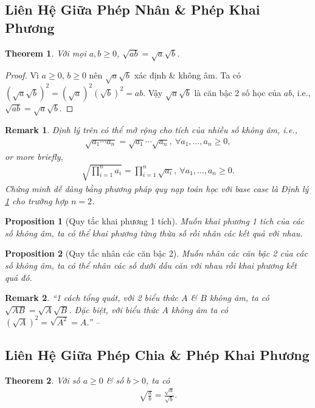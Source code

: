 \documentclass{article}
\numberwithin{equation}{section}
\newtheorem{proposition}{Proposition}[section]
\newtheorem{remark}{Remark}[section]
\newtheorem{theorem}{Theorem}[section]
\begin{document}
\subsection{Liên Hệ Giữa Phép Nhân \& Phép Khai Phương}
\begin{theorem}
	\label{theorem:sqrt & product}
	Với mọi $a,b\ge 0$, $\sqrt{ab} = \sqrt{a}\sqrt{b}$.
\end{theorem}

\begin{proof}
	Vì $a\ge 0$, $b\ge 0$ nên $\sqrt{a}\sqrt{b}$ xác định \& không âm. Ta có $(\sqrt{a}\sqrt{b})^2 = (\sqrt{a})^2(\sqrt{b})^2 = ab$. Vậy $\sqrt{a}\sqrt{b}$ là căn bậc 2 số học của $ab$, i.e., $\sqrt{ab} = \sqrt{a}\sqrt{b}$.
\end{proof}

\begin{remark}
	Định lý trên có thể mở rộng cho tích của nhiều số không âm, i.e.,
	\begin{align*}
		\sqrt{a_1\cdots a_n} = \sqrt{a_1}\cdots\sqrt{a_n},\ \forall a_1,\ldots,a_n\ge 0,
	\end{align*}
	or more briefly,
	\begin{align*}
		\sqrt{\prod_{i=1}^n a_i} = \prod_{i=1}^n \sqrt{a_i},\ \forall a_1,\ldots,a_n\ge 0.
	\end{align*}
	Chứng minh dễ dàng bằng phương pháp quy nạp toán học với base case là Định lý \ref{theorem:sqrt & product} cho trường hợp $n = 2$.
\end{remark}

\begin{proposition}[Quy tắc khai phương 1 tích]
	Muốn khai phương 1 tích của các số không âm, ta có thể khai phương từng thừa số rồi nhân các kết quả với nhau.
\end{proposition}

\begin{proposition}[Quy tắc nhân các căn bậc 2]
	Muốn nhân các căn bậc 2 của các số không âm, ta có thể nhân các số dưới dấu căn với nhau rồi khai phương kết quả đó.
\end{proposition}

\begin{remark}
	``1 cách tổng quát, với 2 biểu thức $A$ \& $B$ không âm, ta có $\sqrt{AB} = \sqrt{A}\sqrt{B}$. Đặc biệt, với biểu thức $A$ không âm ta có $(\sqrt{A})^2 = \sqrt{A^2} = A$.'' -- \cite[p. 14]{SGK_Toan_9_tap_1}
\end{remark}

\subsection{Liên Hệ Giữa Phép Chia \& Phép Khai Phương}
\begin{theorem}
	Với số $a\ge 0$ \& số $b > 0$, ta có
	\begin{align*}
		\sqrt{\frac{a}{b}} = \frac{\sqrt{a}}{\sqrt{b}}.
	\end{align*}
\end{theorem}
\end{document}
